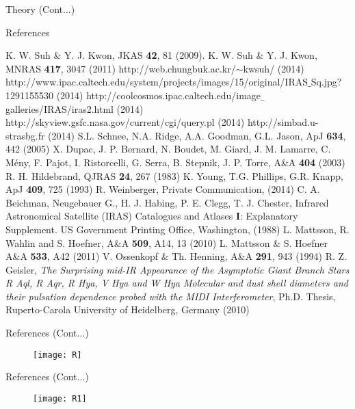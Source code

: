 \documentclass[12pt,a4paper]{beamer}
\begin{document}
\begin{frame}{Theory (Cont...)}
\begin{frame}{References}
\begin{itemize}
\begin{thebibliography}{1}
       K. W. Suh \& Y. J. Kwon, JKAS \textbf{42}, 81 (2009).
      K. W. Suh \& Y. J. Kwon, MNRAS \textbf{417}, 3047 (2011)
      http://web.chungbuk.ac.kr/$\sim$kwsuh/ (2014)
     http://www.ipac.caltech.edu/system/projects/images/15/original/IRAS$\_$Sq.jpg?1291155530 (2014)
     http://coolcosmos.ipac.caltech.edu/image$\_$galleries/IRAS/iras2.html (2014)
http://skyview.gsfc.nasa.gov/current/cgi/query.pl (2014)
      http://simbad.u-strasbg.fr (2014)
    S.L. Schnee, N.A. Ridge, A.A. Goodman, G.L. Jason, ApJ \textbf{634}, 442 (2005)
     X. Dupac, J. P. Bernard, N. Boudet, M. Giard,  J. M. Lamarre,  C. Mény,  F. Pajot,  I. Ristorcelli,  G. Serra, B. Stepnik, J. P. Torre, A\&A \textbf{404} (2003)
    R. H. Hildebrand, QJRAS \textbf{ 24}, 267 (1983)
   K. Young, T.G. Phillips, G.R. Knapp, ApJ \textbf{409}, 725 (1993)
   R. Weinberger, Private Communication, (2014)
    C. A. Beichman, Neugebauer G., H. J. Habing, P. E. Clegg, T. J. Chester, Infrared Astronomical Satellite (IRAS) Catalogues and
Atlases \textbf{ I}: Explanatory Supplement. US Government
Printing Office, Washington, (1988)
      L. Mattsson, R. Wahlin and S. Hoefner, A\&A \textbf{509}, A14, 13 (2010)
      L. Mattsson \& S. Hoefner A\&A \textbf{533}, A42 (2011)
     V. Ossenkopf \& Th. Henning, A\&A \textbf{291}, 943  (1994)
   R. Z. Geisler, \emph{The Surprising mid-IR Appearance
of the Asymptotic Giant Branch Stars R Aql, R Aqr, R Hya, V Hya
and W Hya Molecular and dust shell diameters and their pulsation
dependence probed with the MIDI Interferometer}, Ph.D. Thesis,
Ruperto-Carola University of Heidelberg, Germany (2010)
\end{thebibliography}
\end{itemize}
\end{frame}

\begin{frame}{References (Cont...)}

\begin{figure}[h]
\vspace{0.0cm} \centering
  \texttt{[image: R]}
\end{figure}
\end{frame}

\begin{frame}{References (Cont...)}
\begin{figure}[h]
\vspace{0.0cm} \centering
  \texttt{[image: R1]}
\end{figure}
\end{frame}


\end{frame}
\end{document}
